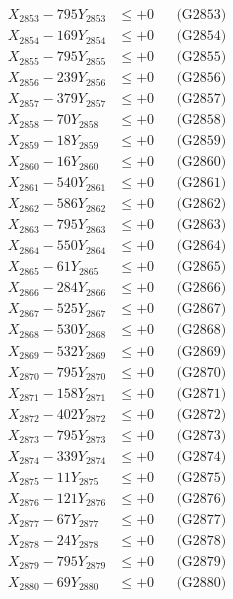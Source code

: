 \documentclass[a4paper,10pt]{article}
\begin{document}
{\begin{align}
X_{2853} - 795Y_{2853} &\leq +0 && \text{(G2853)} \\
X_{2854} - 169Y_{2854} &\leq +0 && \text{(G2854)} \\
X_{2855} - 795Y_{2855} &\leq +0 && \text{(G2855)} \\
X_{2856} - 239Y_{2856} &\leq +0 && \text{(G2856)} \\
X_{2857} - 379Y_{2857} &\leq +0 && \text{(G2857)} \\
X_{2858} - 70Y_{2858} &\leq +0 && \text{(G2858)} \\
X_{2859} - 18Y_{2859} &\leq +0 && \text{(G2859)} \\
X_{2860} - 16Y_{2860} &\leq +0 && \text{(G2860)} \\
\allowbreak
X_{2861} - 540Y_{2861} &\leq +0 && \text{(G2861)} \\
X_{2862} - 586Y_{2862} &\leq +0 && \text{(G2862)} \\
X_{2863} - 795Y_{2863} &\leq +0 && \text{(G2863)} \\
X_{2864} - 550Y_{2864} &\leq +0 && \text{(G2864)} \\
X_{2865} - 61Y_{2865} &\leq +0 && \text{(G2865)} \\
X_{2866} - 284Y_{2866} &\leq +0 && \text{(G2866)} \\
X_{2867} - 525Y_{2867} &\leq +0 && \text{(G2867)} \\
X_{2868} - 530Y_{2868} &\leq +0 && \text{(G2868)} \\
X_{2869} - 532Y_{2869} &\leq +0 && \text{(G2869)} \\
X_{2870} - 795Y_{2870} &\leq +0 && \text{(G2870)} \\
\allowbreak
X_{2871} - 158Y_{2871} &\leq +0 && \text{(G2871)} \\
X_{2872} - 402Y_{2872} &\leq +0 && \text{(G2872)} \\
X_{2873} - 795Y_{2873} &\leq +0 && \text{(G2873)} \\
X_{2874} - 339Y_{2874} &\leq +0 && \text{(G2874)} \\
X_{2875} - 11Y_{2875} &\leq +0 && \text{(G2875)} \\
X_{2876} - 121Y_{2876} &\leq +0 && \text{(G2876)} \\
X_{2877} - 67Y_{2877} &\leq +0 && \text{(G2877)} \\
X_{2878} - 24Y_{2878} &\leq +0 && \text{(G2878)} \\
X_{2879} - 795Y_{2879} &\leq +0 && \text{(G2879)} \\
X_{2880} - 69Y_{2880} &\leq +0 && \text{(G2880)} \\

\end{align}}
\end{document}
